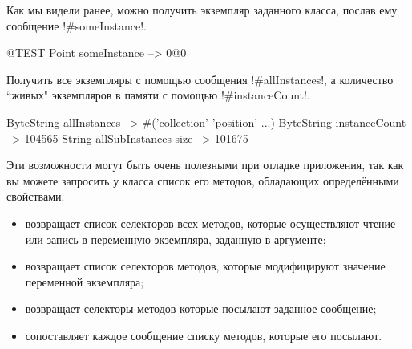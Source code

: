 \documentclass[a4paper,10pt,twoside]{book}
\begin{document}
{%
Как мы видели ранее, можно получить экземпляр заданного класса, послав ему сообщение \ct!#someInstance!.
\begin{code}{@TEST} %
Point someInstance --> 0@0
\end{code}

Получить все экземпляры с помощью сообщения \ct!#allInstances!, а количество ``живых" экземпляров в памяти с помощью \ct!#instanceCount!.
\begin{code}{} %
ByteString allInstances        --> #('collection' 'position'  ...)
ByteString instanceCount    --> 104565
String allSubInstances size -->  101675
\end{code}

Эти возможности  могут быть очень полезными при отладке приложения, так как вы можете запросить у класса список его методов, обладающих определёнными свойствами.
\begin{itemize}
\item {} возвращает список селекторов всех методов, которые осуществляют чтение или запись в переменную экземпляра, заданную в аргументе;
\item {} возвращает список селекторов методов, которые модифицируют значение переменной экземпляра;
\item {} возвращает селекторы методов которые посылают заданное сообщение;
\item {} сопоставляет каждое сообщение списку методов, которые его посылают.
\end{itemize}

}
\end{document}
